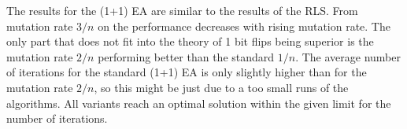 The results for the (1+1) EA are similar to the results of the RLS. From mutation rate $3/n$ on the performance decreases with rising mutation rate.
The only part that does not fit into the theory of 1 bit flips being superior is the mutation rate $2/n$ performing better than the standard $1/n$.
The average number of iterations for the standard (1+1) EA is only slightly higher than for the mutation rate $2/n$, so this might be just due to a too small runs of the algorithms.
All variants reach an optimal solution within the given limit for the number of iterations.